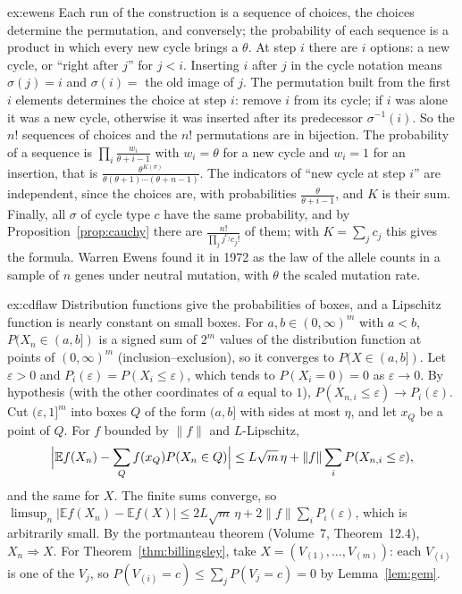 \begin{solution}{ex:ewens}
\idea Each run of the construction is a sequence of choices, the choices determine the permutation, and conversely; the probability of each sequence is a product in which every new cycle brings a $\theta$.
\writeup At step $i$ there are $i$ options: a new cycle, or ``right after $j$'' for $j<i$. Inserting $i$ after $j$ in the cycle notation means $\sigma(j)=i$ and $\sigma(i)=$ the old image of $j$. The permutation built from the first $i$ elements determines the choice at step $i$: remove
$i$ from its cycle; if $i$ was alone it was a new cycle, otherwise it was inserted after its predecessor $\sigma^{-1}(i)$. So the $n!$ sequences of choices and the $n!$ permutations are in bijection. The probability of a sequence is $\prod_i\frac{w_i}{\theta+i-1}$ with $w_i=\theta$ for a new
cycle and $w_i=1$ for an insertion, that is $\frac{\theta^{K(\sigma)}}{\theta(\theta+1)\cdots(\theta+n-1)}$. The indicators of ``new cycle at step $i$'' are independent, since the choices are, with probabilities $\frac\theta{\theta+i-1}$, and $K$ is their sum. Finally, all $\sigma$ of cycle type $c$ have the
same probability, and by Proposition~\ref{prop:cauchy} there are $\frac{n!}{\prod_jj^{c_j}c_j!}$ of them; with $K=\sum_jc_j$ this gives the formula. Warren Ewens found it in 1972 as the law of the allele counts in a sample of $n$ genes under neutral mutation, with $\theta$ the scaled mutation rate.
\end{solution}

\begin{solution}{ex:cdflaw}
\idea Distribution functions give the probabilities of boxes, and a Lipschitz function is nearly constant on small boxes.
\writeup For $a,b\in(0,\infty)^m$ with $a<b$, $P(X_n\in(a,b])$ is a signed sum of $2^m$ values of the distribution function at points of $(0,\infty)^m$ (inclusion--exclusion), so it converges to $P(X\in(a,b])$. Let $\varepsilon>0$ and
$P_i(\varepsilon)=P(X_i\le\varepsilon)$, which tends to $P(X_i=0)=0$ as $\varepsilon\to0$. By hypothesis (with the other coordinates of $a$ equal to $1$), $P(X_{n,i}\le\varepsilon)\to P_i(\varepsilon)$. Cut $(\varepsilon,1]^m$ into boxes $Q$ of the form $(a,b]$ with sides at most $\eta$, and let $x_Q$ be a point of $Q$. For $f$
bounded by $\|f\|$ and $L$-Lipschitz,
\[
\Bigl|\mathbb Ef(X_n)-\sum_Qf(x_Q)P(X_n\in Q)\Bigr|\le L\sqrt m\,\eta+\|f\|\sum_iP(X_{n,i}\le\varepsilon),
\]
and the same for $X$. The finite sums converge, so $\limsup_n|\mathbb Ef(X_n)-\mathbb Ef(X)|\le2L\sqrt m\,\eta+2\|f\|\sum_iP_i(\varepsilon)$, which is arbitrarily small. By the portmanteau theorem (Volume~7, Theorem~12.4), $X_n\Rightarrow X$. For Theorem~\ref{thm:billingsley}, take
$X=(V_{(1)},\dots,V_{(m)})$: each $V_{(i)}$ is one of the $V_j$, so $P(V_{(i)}=c)\le\sum_jP(V_j=c)=0$ by Lemma~\ref{lem:gem}.
\end{solution}

